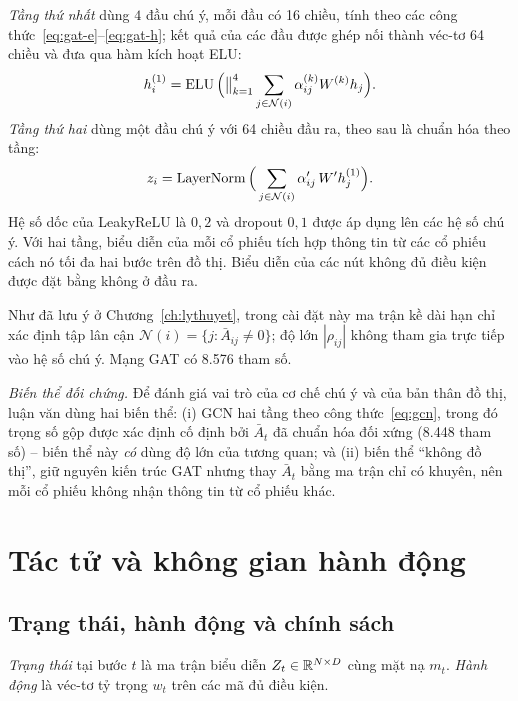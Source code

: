 \textit{Tầng thứ nhất} dùng $4$ đầu chú ý, mỗi đầu có 16 chiều, tính theo các công thức~\eqref{eq:gat-e}--\eqref{eq:gat-h}; kết quả của các đầu được ghép nối thành véc-tơ 64 chiều và đưa qua hàm kích hoạt ELU:
\begin{equation}
h_i^{(1)}=\operatorname{ELU}\Big(\big\Vert_{k=1}^{4}\sum_{j\in\mathcal{N}(i)}\alpha_{ij}^{(k)}W^{(k)}h_j\Big).
\end{equation}
\textit{Tầng thứ hai} dùng một đầu chú ý với 64 chiều đầu ra, theo sau là chuẩn hóa theo tầng:
\begin{equation}
z_i=\operatorname{LayerNorm}\Big(\sum_{j\in\mathcal{N}(i)}\alpha_{ij}'\,W'h_j^{(1)}\Big).
\end{equation}
Hệ số dốc của LeakyReLU là $0{,}2$ và dropout $0{,}1$ được áp dụng lên các hệ số chú ý. Với hai tầng, biểu diễn của mỗi cổ phiếu tích hợp thông tin từ các cổ phiếu cách nó tối đa hai bước trên đồ thị. Biểu diễn của các nút không đủ điều kiện được đặt bằng không ở đầu ra.

Như đã lưu ý ở Chương~\ref{ch:lythuyet}, trong cài đặt này ma trận kề dài hạn chỉ xác định tập lân cận $\mathcal{N}(i)=\{j:\bar A_{ij}\ne0\}$; độ lớn $|\rho_{ij}|$ không tham gia trực tiếp vào hệ số chú ý. Mạng GAT có 8.576 tham số.

\textit{Biến thể đối chứng.} Để đánh giá vai trò của cơ chế chú ý và của bản thân đồ thị, luận văn dùng hai biến thể: (i) GCN hai tầng theo công thức~\eqref{eq:gcn}, trong đó trọng số gộp được xác định cố định bởi $\bar A_t$ đã chuẩn hóa đối xứng (8.448 tham số) -- biến thể này \emph{có} dùng độ lớn của tương quan; và (ii) biến thể ``không đồ thị'', giữ nguyên kiến trúc GAT nhưng thay $\bar A_t$ bằng ma trận chỉ có khuyên, nên mỗi cổ phiếu không nhận thông tin từ cổ phiếu khác.

\section{Tác tử và không gian hành động}
\label{sec:agent}

\subsection{Trạng thái, hành động và chính sách}

\textit{Trạng thái} tại bước $t$ là ma trận biểu diễn $Z_t\in\mathbb{R}^{N\times D}$ cùng mặt nạ $m_t$. \textit{Hành động} là véc-tơ tỷ trọng $w_t$ trên các mã đủ điều kiện.

